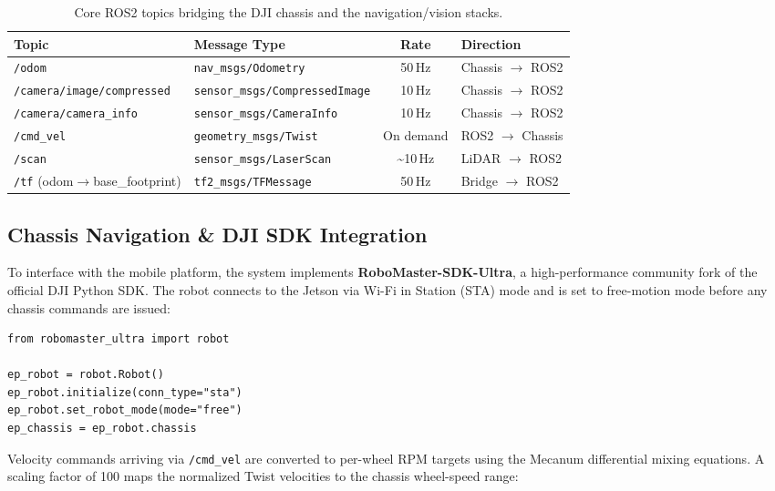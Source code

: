\begin{table}[!htb]
  \footnotesize
  \centering
  \caption{Core ROS2 topics bridging the DJI chassis and the navigation/vision stacks.}
  \label{tab:ros2_topics}
  \begin{tabular}{@{}llcl@{}}
    \toprule
    \textbf{Topic} & \textbf{Message Type} & \textbf{Rate} & \textbf{Direction} \\
    \midrule
    \texttt{/odom} & \texttt{nav\_msgs/Odometry} & 50\,Hz & Chassis $\to$ ROS2 \\
    \texttt{/camera/image/compressed} & \texttt{sensor\_msgs/CompressedImage} & 10\,Hz & Chassis $\to$ ROS2 \\
    \texttt{/camera/camera\_info} & \texttt{sensor\_msgs/CameraInfo} & 10\,Hz & Chassis $\to$ ROS2 \\
    \texttt{/cmd\_vel} & \texttt{geometry\_msgs/Twist} & On demand & ROS2 $\to$ Chassis \\
    \texttt{/scan} & \texttt{sensor\_msgs/LaserScan} & \textasciitilde10\,Hz & LiDAR $\to$ ROS2 \\
    \texttt{/tf} (odom$\to$base\_footprint) & \texttt{tf2\_msgs/TFMessage} & 50\,Hz & Bridge $\to$ ROS2 \\
    \bottomrule
  \end{tabular}
\end{table}


\subsection{Chassis Navigation \& DJI SDK Integration}
\label{sec:dji-sdk}

To interface with the mobile platform, the system implements \textbf{RoboMaster-SDK-Ultra}, a high-performance community fork of the official DJI Python SDK. The robot connects to the Jetson via Wi-Fi in Station (STA) mode and is set to free-motion mode before any chassis commands are issued:

\begin{verbatim}
from robomaster_ultra import robot

ep_robot = robot.Robot()
ep_robot.initialize(conn_type="sta")
ep_robot.set_robot_mode(mode="free")
ep_chassis = ep_robot.chassis
\end{verbatim}

Velocity commands arriving via \texttt{/cmd\_vel} are converted to per-wheel RPM targets using the Mecanum differential mixing equations. A scaling factor of 100 maps the normalized Twist velocities to the chassis wheel-speed range:

